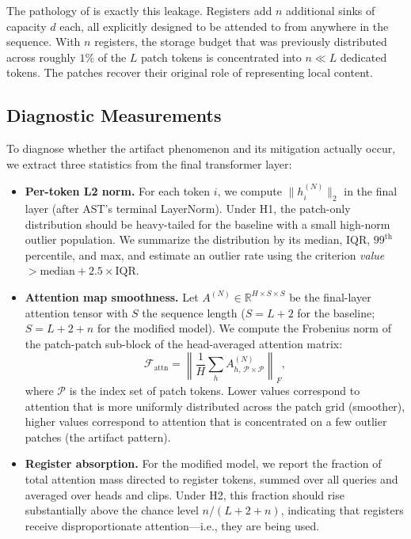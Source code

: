 \documentclass[conference]{IEEEtran}
\begin{document}
The pathology of \cite{darcet2024need} is exactly this leakage. Registers add $n$ additional sinks of capacity $d$ each, all explicitly designed to be attended to from anywhere in the sequence. With $n$ registers, the storage budget that was previously distributed across roughly $1\%$ of the $L$ patch tokens is concentrated into $n \ll L$ dedicated tokens. The patches recover their original role of representing local content.

\subsection{Diagnostic Measurements}
\label{sec:method-diag}

To diagnose whether the artifact phenomenon and its mitigation actually occur, we extract three statistics from the final transformer layer:

\begin{itemize}
    \item \textbf{Per-token L2 norm.} For each token $i$, we compute $\|h^{(N)}_i\|_2$ in the final layer (after AST's terminal LayerNorm). Under H1, the patch-only distribution should be heavy-tailed for the baseline with a small high-norm outlier population. We summarize the distribution by its median, IQR, $99^{\text{th}}$ percentile, and max, and estimate an outlier rate using the criterion \emph{value} $> \mathrm{median} + 2.5 \times \mathrm{IQR}$.
    \item \textbf{Attention map smoothness.} Let $A^{(N)} \in \mathbb{R}^{H \times S \times S}$ be the final-layer attention tensor with $S$ the sequence length ($S = L+2$ for the baseline; $S = L+2+n$ for the modified model). We compute the Frobenius norm of the patch-patch sub-block of the head-averaged attention matrix:
    \begin{equation}
    \mathcal{F}_{\text{attn}} = \left\| \frac{1}{H} \sum_h A^{(N)}_{h,\, \mathcal{P} \times \mathcal{P}} \right\|_F,
    \label{eq:frob}
    \end{equation}
    where $\mathcal{P}$ is the index set of patch tokens. Lower values correspond to attention that is more uniformly distributed across the patch grid (smoother), higher values correspond to attention that is concentrated on a few outlier patches (the artifact pattern).
    \item \textbf{Register absorption.} For the modified model, we report the fraction of total attention mass directed to register tokens, summed over all queries and averaged over heads and clips. Under H2, this fraction should rise substantially above the chance level $n/(L+2+n)$, indicating that registers receive disproportionate attention---i.e., they are being used.
\end{itemize}
\end{document}
